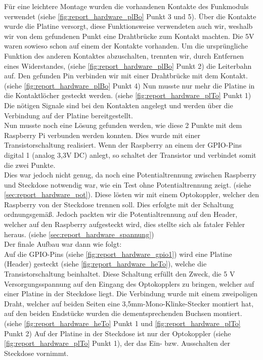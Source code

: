 Für eine leichtere Montage wurden die vorhandenen Kontakte des Funkmoduls verwendet (siehe \autoref{fig:report_hardware_plBo} Punkt 3 und 5). Über die Kontakte wurde die Platine versorgt, diese Funktionsweise verwendeten auch wir, weshalb wir von dem gefundenen Punkt eine Drahtbrücke zum Kontakt machten. Die 5V waren sowieso schon auf einem der Kontakte vorhanden. Um die ursprüngliche Funktion des anderen Kontaktes abzuschalten, trennten wir, durch Entfernen eines Widerstandes, (siehe \autoref{fig:report_hardware_plBo} Punkt 2) die Leiterbahn auf. Den gefunden Pin verbinden wir mit einer Drahtbrücke mit dem Kontakt. (siehe \autoref{fig:report_hardware_plBo} Punkt 4) Nun musste nur mehr die Platine in die Kontaktlöcher gesteckt werden. (siehe \autoref{fig:report_hardware_plTo} Punkt 1) Die nötigen Signale sind bei den Kontakten angelegt und werden über die Verbindung auf der Platine bereitgestellt.\\
Nun musste noch eine Lösung gefunden werden, wie diese 2 Punkte mit dem Raspberry Pi verbunden werden konnten. Dies wurde mit einer Transistorschaltung realisiert. Wenn der Raspberry an einem der GPIO-Pins digital 1 (analog 3,3V DC) anlegt, so schaltet der Transistor und verbindet somit die zwei Punkte. \\
Dies war jedoch nicht genug, da noch eine Potentialtrennung zwischen Raspberry und Steckdose  notwendig war, wie ein Test ohne Potentialtrennung zeigt. (siehe \autoref{sec:report_hardware_pot}). Diese lösten wir mit einem Optokoppler, welcher den Raspberry von der Steckdose trennen soll. Dies erfolgte mit der Schaltung ordnungsgemäß. Jedoch packten wir die Potentialtrennung auf den Header, welcher auf den Raspberry aufgesteckt wird, dies stellte sich als fataler Fehler heraus. (siehe \autoref{sec:report_hardware_spannung})\\
Der finale Aufbau war dann wie folgt:\\
Auf die GPIO-Pins (siehe \autoref{fig:report_hardware_gpio1}) wird eine Platine (Header) gesteckt (siehe \autoref{fig:report_hardware_heTo}), welche die Transistorschaltung beinhaltet. Diese Schaltung erfüllt den Zweck, die 5 V Versorgungsspannung auf den Eingang des Optokopplers zu bringen, welcher auf einer Platine in der Steckdose liegt. Die Verbindung wurde mit einem zweipoligen Draht, welcher auf beiden Seiten eine 3,5mm-Mono-Klinke-Stecker montiert hat, auf den beiden Endstücke wurden die dementsprechenden Buchsen montiert. (siehe \autoref{fig:report_hardware_heTo} Punkt 1 und \autoref{fig:report_hardware_plTo} Punkt 2) Auf der Platine in der Steckdose ist nur der Optokoppler (siehe \autoref{fig:report_hardware_plTo} Punkt 1), der das Ein- bzw. Ausschalten der Steckdose vornimmt.\\\\
